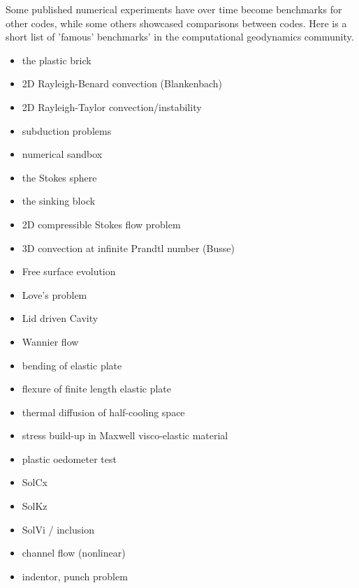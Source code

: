 Some published numerical experiments have over time become benchmarks for other codes, while some 
others showcased comparisons between codes. Here is a short list of 'famous' benchmarks' in the 
computational geodynamics community.

\begin{itemize}
\item the plastic brick \cite{lemm08,kaus10,qurj09,maie12}
\item 2D Rayleigh-Benard convection (Blankenbach)  \cite{blbc89,trha98,chhl08,king09,lezh11,vyrc13,trab90}
\item 2D Rayleigh-Taylor convection/instability \cite{pros81,trab90,soga01,bast02,taki03,bomh06, basd08,qurj09,saev10,lezh11,vyrc13,vkks97,bomh06,chtl13,deka08,maie12} 
\item subduction problems \cite{scbe08,vack08,cehg14}
\item numerical sandbox \cite{bbeg06,maie12,busa16}
\item the Stokes sphere \cite{galemanual}
\item the sinking block \cite{thie11,cehg14,gery10,geyu03,maie12}
\item 2D compressible Stokes flow problem \cite{lezh08}
\item 3D convection at infinite Prandtl number (Busse) \cite{bucc93,trha98}
\item Free surface evolution \cite{crsg12}
\item Love's problem \cite{bebe04}
\item Lid driven Cavity \cite{bope98,kawa61}
\item Wannier flow \cite{wann50,yemu99}
\item bending of elastic plate \cite{cehg14,boht08a}
\item flexure of finite length elastic plate \cite{chtl13}
\item thermal diffusion of half-cooling space \cite{chtl13}
\item stress build-up in Maxwell visco-elastic material \cite{geyu07,chtl13}
\item plastic oedometer test  \cite{chtl13}
\item SolCx
\item SolKz
\item SolVi / inclusion \cite{kapo06,maie12,deka08}
\item channel flow (nonlinear) \cite{maie12,frbt19,gery10}
\item indentor, punch problem \cite{thfb08,mota77}
\end{itemize}

